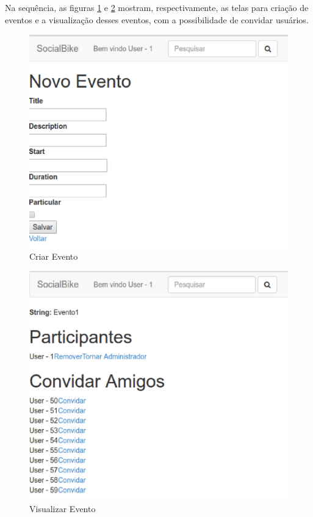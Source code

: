 Na sequência, as figuras \ref{criar_evento} e \ref{evento} mostram, respectivamente, as telas para criação de eventos e a visualização desses eventos, com a possibilidade de convidar usuários.

\newpage
\begin{figure}[!h]
	\centering
	\includegraphics[scale=0.5]{figuras/resultados/criar_evento.eps}
	\caption[Criar Evento]{Criar Evento}
	\label{criar_evento}
\end{figure}

\begin{figure}[!h]
	\centering
	\includegraphics[scale=0.5]{figuras/resultados/evento.eps}
	\caption[Visualizar Evento]{Visualizar Evento}
	\label{evento}
\end{figure}

